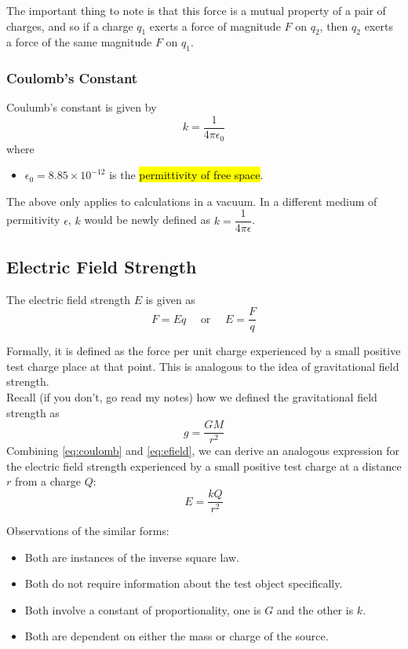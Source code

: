 \documentclass[a4paper,12pt]{article}
\newcommand{\lb}{\\[8pt]}
\begin{document}
The important thing to note is that this force is a mutual property of a pair of charges, and so if a charge $q_1$ exerts a force of magnitude $F$ on $q_2$, then $q_2$ exerts a force of the same magnitude $F$ on $q_1$.

\subsubsection{Coulomb's Constant}

Coulumb's constant is given by
\begin{equation}\label{eq:coulombconstant}
  k = \frac{1}{4\pi\epsilon_0}
\end{equation}
where
\begin{itemize}
  \item $\epsilon_0 = 8.85 \times 10^{-12}$ is the \hl{permittivity of free space}.
\end{itemize}
The above only applies to calculations in a vacuum. In a different medium of permitivity $\epsilon$, $k$ would be newly defined as $k = \dfrac{1}{4\pi\epsilon}$.

\pagebreak

\subsection{Electric Field Strength}

The electric field strength $E$ is given as
\begin{equation}\label{eq:efield}
  F = Eq \quad \text{ or } \quad E = \frac{F}{q}
\end{equation}

Formally, it is defined as the force per unit charge experienced by a small positive test charge place at that point. This is analogous to the idea of gravitational field strength.\lb
Recall (if you don't, go read my notes) how we defined the gravitational field strength as
$$g = \frac{GM}{r^2}$$
Combining \cref{eq:coulomb} and \cref{eq:efield}, we can derive an analogous expression for the electric field strength experienced by a small positive test charge at a distance $r$ from a charge $Q$:
\begin{equation}\label{eq:efield2}
  E = \frac{kQ}{r^2}
\end{equation}

Observations of the similar forms:
\begin{itemize}
  \item Both are instances of the inverse square law.
  \item Both do not require information about the test object specifically.
  \item Both involve a constant of proportionality, one is $G$ and the other is $k$.
  \item Both are dependent on either the mass or charge of the source.
\end{itemize}
\end{document}
